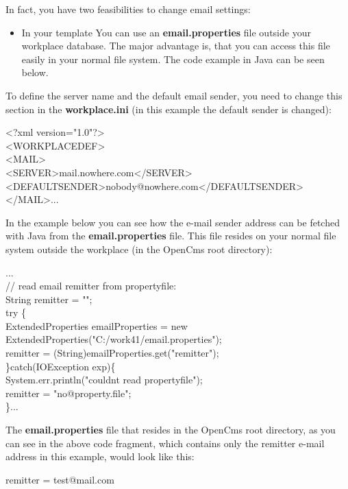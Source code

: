 In fact, you have two feasibilities to change email settings:
\begin{itemize}
\item In your template
You can use an {\bf email.properties} file outside your workplace
database. The major advantage is, that you can access this file easily
in your normal file system. The code example in Java can be seen below.
\end{itemize}

To define the server name and the default email sender, you need to
change this section in the {\bf workplace.ini} (in this example the default
sender is changed):

\begin{xml}
<?xml version="1.0"?>\\
<WORKPLACEDEF>\\
<MAIL>\\
\xtaba        <SERVER>mail.nowhere.com</SERVER>\\
\xtaba        <DEFAULTSENDER>nobody@nowhere.com</DEFAULTSENDER>\\
</MAIL>...\\
\end{xml}

In the example below you can see how the e-mail sender address can be
fetched with Java from the {\bf email.properties} file. This file resides on
your normal file system outside the workplace (in the OpenCms {\dir root}
directory):

\begin{java}
...\\
// read email remitter from propertyfile:\\
String remitter = "";\\
try \{\\
ExtendedProperties emailProperties = new\\
ExtendedProperties("C:/work41/email.properties");\\
\jtaba        remitter = (String)emailProperties.get("remitter");\\
\}catch(IOException exp)\{\\
\jtaba        System.err.println("couldnt read propertyfile");\\
\jtabb                remitter = "no@property.file";\\
\}...\\
\end{java}

The {\bf email.properties} file that resides in the OpenCms root directory,
as you can see in the above code fragment, which contains only the
remitter e-mail address in this example, would look like this:
\begin {center}
remitter = test@mail.com
\end{center}

